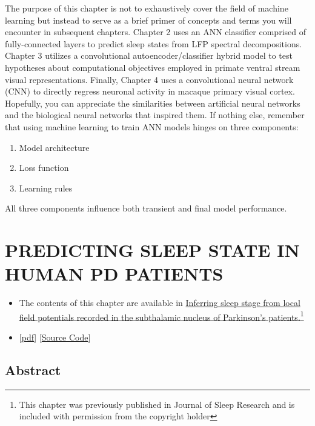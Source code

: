 \documentclass{templates/ucdenverthesis}
\begin{document}
The purpose of this chapter is not to exhaustively cover the field of machine learning but instead to serve as a brief primer of concepts and terms you will encounter in subsequent chapters. Chapter 2 uses an ANN classifier comprised of fully-connected layers to predict sleep states from LFP spectral decompositions. Chapter 3 utilizes a convolutional autoencoder/classifier hybrid model to test hypotheses about computational objectives employed in primate ventral stream visual representations.
Finally, Chapter 4 uses a convolutional neural network (CNN) to directly regress neuronal activity in macaque primary visual cortex.
Hopefully, you can appreciate the similarities between artificial neural networks and the biological neural networks that inspired them. If nothing else, remember that using machine learning to train ANN models hinges on three components:

\begin{enumerate}
\def\labelenumi{\arabic{enumi})}
\tightlist
\item
  Model architecture
\item
  Loss function
\item
  Learning rules
\end{enumerate}

All three components influence both transient and final model performance.

\hypertarget{ch3:jsr}{%
\chapter{PREDICTING SLEEP STATE IN HUMAN PD PATIENTS}\label{ch3:jsr}}

\begin{itemize}
\item
  The contents of this chapter are available in \href{https://doi.org/10.1111/jsr.12806}{Inferring sleep stage from local field potentials recorded in the subthalamic nucleus of Parkinson's patients.}\footnote{This chapter was previously published in \autocite{Christensen:2019ik} Journal of Sleep Research and is included with permission from the copyright holder}
\item
  {[}\href{http://www.jzlab.org/Christensen_JSleepResearch2018_LFP_ANN_DBS.pdf}{pdf}{]} {[}\href{https://github.com/jzlab/sleep_net}{Source Code}{]}
\end{itemize}

\hypertarget{abstract}{%
\section*{Abstract}\label{abstract}}
\end{document}
